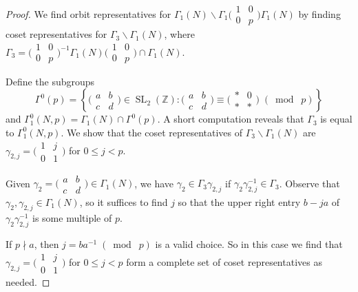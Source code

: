 \documentclass[10pt,leqno,twoside]{article}
\theoremstyle{plain}
\theoremstyle{definition}
\numberwithin{equation}{section}
\numberwithin{lem}{section}
\newcommand{\cbr}[1]{\left\{#1\right\}}
\DeclareMathOperator{\SL}{SL}
\newcommand{\smod}[1]{\;(\bmod\; #1)}
\newcommand{\smallabcd}{\big(\!\begin{smallmatrix}
    a & b \\ c & d
\end{smallmatrix}\!\big)}
\newcommand{\slz}{\SL_2(\mathbb{Z})}
\begin{document}
\begin{proof}
    We find orbit representatives for $\varGamma_1(N)\backslash \varGamma_1\big(\!\begin{smallmatrix}
        1 & 0 \\ 0 & p
    \end{smallmatrix}\!\big)\varGamma_1(N)$ by finding coset representatives for $\varGamma_3\backslash\varGamma_1(N)$, where $\varGamma_3 = \big(\!\begin{smallmatrix}
        1 & 0 \\ 0 & p
    \end{smallmatrix}\!\big)^{-1}\varGamma_1(N)\big(\!\begin{smallmatrix}
        1 & 0 \\ 0 & p
    \end{smallmatrix}\!\big)\cap \varGamma_1(N)$.

    Define the subgroups 
    \[\varGamma^0(p) = \cbr{\smallabcd\in\slz : \smallabcd \equiv \big(\!\begin{smallmatrix}
        \ast & 0 \\ \ast & \ast
    \end{smallmatrix}\!\big)\smod p}\] and $\varGamma_1^0(N,p) = \varGamma_1(N)\cap \varGamma^0(p)$. A short computation reveals that $\varGamma_3$ is equal to $\varGamma_1^0(N,p)$. We show that the coset representatives of $\varGamma_3\backslash \varGamma_1(N)$ are $\gamma_{2,j} = \big(\!\begin{smallmatrix}
        1& j \\ 0 & 1
    \end{smallmatrix}\!\big)$ for $0\leq j < p$.

    Given $\gamma_2 = \smallabcd\in\varGamma_1(N)$, we have $\gamma_2\in\varGamma_3\gamma_{2,j}$ if $\gamma_2\gamma_{2,j}^{-1}\in\varGamma_3$. Observe that $\gamma_2,\gamma_{2,j}\in\varGamma_1(N)$, so it suffices to find $j$ so that the upper right entry $b-ja$ of $\gamma_2\gamma_{2,j}^{-1}$ is some multiple of $p$.
    
    If $p\nmid a$, then $j = ba^{-1}\smod p$ is a valid choice. So in this case we find that $\gamma_{2,j} = \big(\!\begin{smallmatrix}
        1& j \\ 0 & 1
    \end{smallmatrix}\!\big)$ for $0\leq j < p$ form a complete set of coset representatives as needed.
    

\end{proof}
\end{document}
